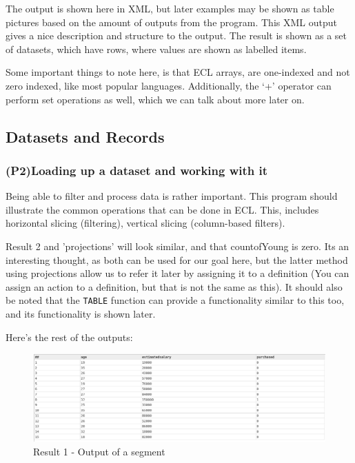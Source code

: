 \documentclass[a4paper,oneside,12pt]{book}
\begin{document}


\pagebreak
The output is shown here in XML, but later examples may be shown as table pictures based on the amount of outputs from the program.
This XML output gives a nice description and structure to the output. The result is shown as a set of datasets, which have rows, where values are shown as labelled items.

Some important things to note here, is that ECL arrays, are one-indexed and not zero indexed, like most popular languages. 
Additionally, the `+' operator can perform set operations as well, which we can talk about more later on.




\subsection{Datasets and Records}

\subsubsection[Common data operations]{(P2)Loading up a dataset and working with it}

Being able to filter and process data is rather important. This program should illustrate the common operations that can be done in ECL. This, includes horizontal slicing (filtering), vertical slicing (column-based filters).





Result 2 and 'projections' will look similar, and that countofYoung is zero. Its an interesting thought, as both can be used for our goal here, but the latter method using projections allow us to refer it later by assigning it to a definition (You can assign an action to a definition, but that is not the same as this). It should also be noted that the \lstinline{TABLE} function can provide a functionality similar to this too, and its functionality is shown later.

Here's the rest of the outputs:

\begin{figure}[h]
    \centering
    \includegraphics[width=\linewidth]{../output/26/1.png}
    \caption{Result 1 - Output of a segment}
\end{figure}
\end{document}
